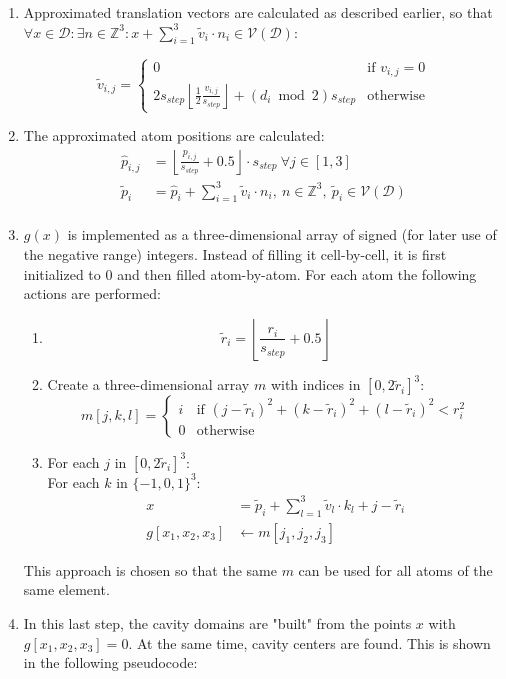 \begin{enumerate}
\item{Approximated translation vectors are calculated as described earlier, so that $\forall x \in \mathcal{D}\colon \exists n\in\mathbb{Z}^3\colon x+\sum_{i=1}^3 \tilde{v}_i \cdot n_i \in \mathcal{V}(\mathcal{D})$:

\[
\tilde{v}_{i,j} = \begin{cases}0 & \text{if } v_{i,j} = 0\\
2 s_{step}\left\lfloor \frac{1}{2} \frac{v_{i,j}}{s_{step}}\right\rfloor + (d_i \bmod 2) s_{step}& \text{otherwise}\end{cases}
\]
}
\item{The approximated atom positions are calculated:
\begin{align*}
\hat{p}_{i,j} &= \left\lfloor\frac{p_{i,j}}{s_{step}}+0.5\right\rfloor \cdot s_{step} ~\forall j \in [1,3]\\
\tilde{p}_i &= \hat{p}_i+ \sum_{i=1}^3 \tilde{v}_i \cdot n_i,~ n \in \mathbb{Z}^3,~ \tilde{p}_i \in \mathcal{V(\mathcal{D})}\\
\end{align*}
}
\item{$g(x)$ is implemented as a three-dimensional array of signed (for later use of the negative range) integers. Instead of filling it cell-by-cell, it is first initialized to 0 and then filled atom-by-atom. For each atom the following actions are performed:
\begin{enumerate}
\item {\[\tilde{r}_i = \left\lfloor \frac{r_i}{s_{step}} +0.5 \right\rfloor\]}
\item {Create a three-dimensional array $m$ with indices in $[0,2\tilde{r}_i]^3$:
\[m[j,k,l] = \left\{\begin{array}{cl}i&\text{if }(j-\tilde{r}_i)^2+(k-\tilde{r}_i)^2+(l-\tilde{r}_i)^2 < r_i^2\\0&\text{otherwise}\end{array}\right.\]}
\item {For each $j$ in $[0,2\tilde{r}_i]^3$:\\
For each $k$ in $\{-1,0,1\}^3$:\\
\begin{align*}
x &= \tilde{p}_i + \sum_{l=1}^3 \tilde{v}_l \cdot k_l + j-\tilde{r}_i\\
g[x_1,x_2,x_3] &\leftarrow m[j_1,j_2,j_3]
\end{align*}
}
\end{enumerate}
This approach is chosen so that the same $m$ can be used for all atoms of the same element.
}
\item{In this last step, the cavity domains are "built" from the points $x$ with $g[x_1,x_2,x_3] = 0$. At the same time, cavity centers are found. This is shown in the following pseudocode:

}
\end{enumerate}
